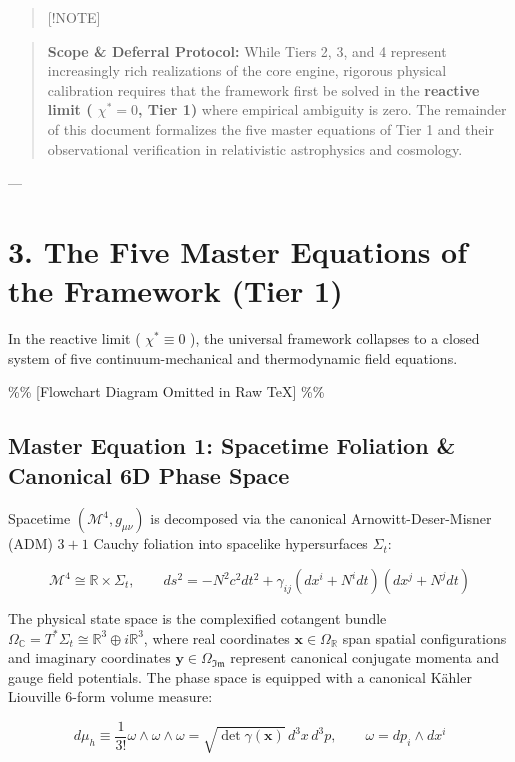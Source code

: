 \documentclass[11pt,a4paper]{article}
\theoremstyle{definition}
\theoremstyle{remark}
\begin{document}
\begin{quote}[!NOTE]\end{quote}
\begin{quote}\textbf{Scope \& Deferral Protocol:} While Tiers 2, 3, and 4 represent increasingly rich realizations of the core engine, rigorous physical calibration requires that the framework first be solved in the \textbf{reactive limit ( $\chi^* = 0$, Tier 1)} where empirical ambiguity is zero. The remainder of this document formalizes the five master equations of Tier 1 and their observational verification in relativistic astrophysics and cosmology.\end{quote}

---

\section{3. The Five Master Equations of the Framework (Tier 1)}

In the reactive limit ( $\chi^* \equiv 0$ ), the universal framework collapses to a closed system of five continuum-mechanical and thermodynamic field equations.

\%\% [Flowchart Diagram Omitted in Raw TeX] \%\%

\subsection{Master Equation 1: Spacetime Foliation \& Canonical 6D Phase Space}
Spacetime $(\mathcal{M}^4, g_{\mu\nu})$ is decomposed via the canonical Arnowitt-Deser-Misner (ADM) $3+1$ Cauchy foliation into spacelike hypersurfaces $\Sigma_t$:


\begin{equation}
\mathcal{M}^4 \cong \mathbb{R} \times \Sigma_t, \qquad ds^2 = -N^2 c^2 dt^2 + \gamma_{ij}(dx^i + N^i dt)(dx^j + N^j dt)
\end{equation}


The physical state space is the complexified cotangent bundle $\Omega_{\mathbb{C}} = T^*\Sigma_t \cong \mathbb{R}^3 \oplus i\mathbb{R}^3$, where real coordinates $\mathbf{x} \in \Omega_{\mathbb{R}}$ span spatial configurations and imaginary coordinates $\mathbf{y} \in \Omega_{\mathfrak{Im}}$ represent canonical conjugate momenta and gauge field potentials. The phase space is equipped with a canonical Kähler Liouville 6-form volume measure:


\begin{equation}
\boxed{d\mu_h \equiv \frac{1}{3!} \omega \wedge \omega \wedge \omega = \sqrt{\det \gamma(\mathbf{x})} \, d^3x \, d^3p, \qquad \omega = dp_i \wedge dx^i}
\end{equation}
\end{document}

